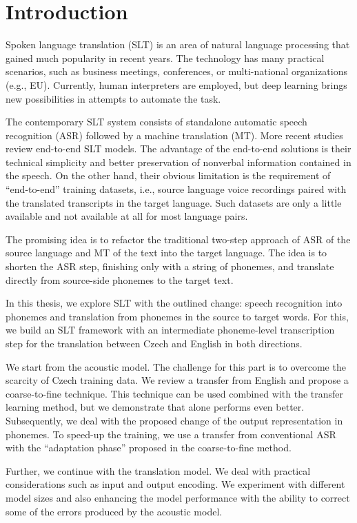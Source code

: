 \chapter*{Introduction}

Spoken language translation (SLT) is an area of natural language processing that gained much popularity in recent years. The technology has many practical scenarios, such as business meetings, conferences, or multi-national organizations (e.g., EU). Currently, human interpreters are employed, but deep learning brings new possibilities in attempts to automate the task.

The contemporary SLT system consists of standalone automatic speech recognition (ASR) followed by a machine translation (MT). More recent studies review end-to-end SLT models. The advantage of the end-to-end solutions is their technical simplicity and better preservation of nonverbal information contained in the speech. On the other hand, their obvious limitation is the requirement of ``end-to-end'' training datasets, i.e., source language voice recordings paired with the translated transcripts in the target language. Such datasets are only a little available and not available at all for most language pairs.

The promising idea is to refactor the traditional two-step approach of ASR of the source language and MT of the text into the target language. The idea is to shorten the ASR step, finishing only with a string of phonemes, and translate directly from source-side phonemes to the target text.

In this thesis, we explore SLT with the outlined change: speech recognition into phonemes and translation from phonemes in the source to target words. For this, we build an SLT framework with an intermediate phoneme-level transcription step for the translation between Czech and English in both directions. 

We start from the acoustic model. The challenge for this part is to overcome the scarcity of Czech training data. We review a transfer from English and propose a coarse-to-fine technique. This technique can be used combined with the transfer learning method, but we demonstrate that alone performs even better. Subsequently, we deal with the proposed change of the output representation in phonemes. To speed-up the training, we use a transfer from conventional ASR with the ``adaptation phase'' proposed in the coarse-to-fine method.

Further, we continue with the translation model. We deal with practical considerations such as input and output encoding. We experiment with different model sizes and also enhancing the model performance with the ability to correct some of the errors produced by the acoustic model.

